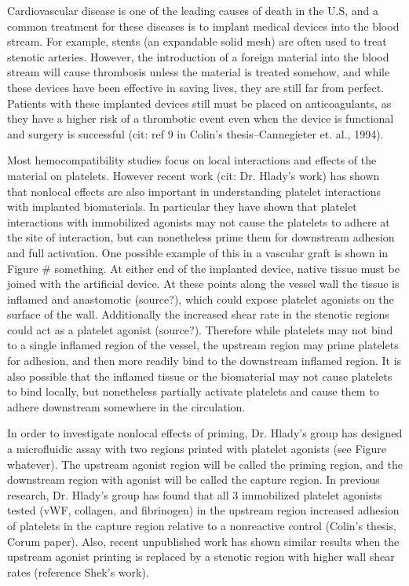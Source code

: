

Cardiovascular disease is one of the leading causes of death in the
U.S, and a common treatment for these diseases is to implant medical
devices into the blood stream. For example, stents (an expandable
solid mesh) are often used to treat stenotic arteries. However, the
introduction of a foreign material into the blood stream will cause
thrombosis unless the material is treated somehow, and while these
devices have been effective in saving lives, they are still far from
perfect. Patients with these implanted devices still must be placed on
anticoagulants, as they have a higher risk of a thrombotic event even
when the device is functional and surgery is successful (cit: ref 9 in
Colin's thesis--Cannegieter et. al., 1994).
		

Most hemocompatibility studies focus on local interactions and effects
of the material on platelets. However recent work (cit: Dr. Hlady's
work) has shown that nonlocal effects are also important in
understanding platelet interactions with implanted biomaterials. In
particular they have shown that platelet interactions with immobilized
agonists may not cause the platelets to adhere at the site of
interaction, but can nonetheless prime them for downstream adhesion
and full activation. One possible example of this in a vascular graft
is shown in Figure \# something. At either end of the implanted
device, native tissue must be joined with the artificial device. At
these points along the vessel wall the tissue is inflamed and
anastomotic (source?), which could expose platelet agonists on the
surface of the wall. Additionally the increased shear rate in the
stenotic regions could act as a platelet agonist (source?). Therefore
while platelets may not bind to a single inflamed region of the
vessel, the upstream region may prime platelets for adhesion, and then
more readily bind to the downstream inflamed region. It is also
possible that the inflamed tissue or the biomaterial may not cause
platelets to bind locally, but nonetheless partially activate
platelets and cause them to adhere downstream somewhere in the
circulation.
		
In order to investigate nonlocal effects of priming, Dr. Hlady's group
has designed a microfluidic assay with two regions printed with
platelet agonists (see Figure whatever). The upstream agonist region
will be called the priming region, and the downstream region with
agonist will be called the capture region. In previous research,
Dr. Hlady's group has found that all 3 immobilized platelet agonists
tested (vWF, collagen, and fibrinogen) in the upstream region
increased adhesion of platelets in the capture region relative to a
nonreactive control (Colin's thesis, Corum paper). Also, recent
unpublished work has shown similar results when the upstream agonist
printing is replaced by a stenotic region with higher wall shear rates
(reference Shek's work).

